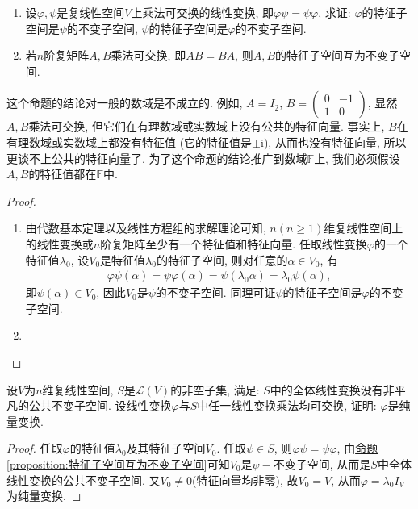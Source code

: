 \documentclass[../../main.tex]{subfiles}%
\begin{document}
\begin{proposition}[特征子空间互为不变子空间]\label{proposition:特征子空间互为不变子空间}
\begin{enumerate}
\item 设\(\varphi,\psi\)是复线性空间\(V\)上乘法可交换的线性变换, 即\(\varphi\psi = \psi\varphi\), 求证: \(\varphi\)的特征子空间是\(\psi\)的不变子空间, \(\psi\)的特征子空间是\(\varphi\)的不变子空间.

\item 若\(n\)阶复矩阵\(A,B\)乘法可交换, 即\(AB = BA\), 则\(A,B\)的特征子空间互为不变子空间.
\end{enumerate}
\end{proposition}
\begin{remark}
这个命题的结论对一般的数域是不成立的. 例如, \(A = I_{2}\), \(B=\begin{pmatrix}
0& -1\\
1& 0
\end{pmatrix}\), 显然\(A,B\)乘法可交换, 但它们在有理数域或实数域上没有公共的特征向量. 事实上, \(B\)在有理数域或实数域上都没有特征值 (它的特征值是\(\pm\mathrm{i}\)), 从而也没有特征向量, 所以更谈不上公共的特征向量了. 为了这个命题的结论推广到数域\(\mathbb{F}\)上, 我们必须假设\(A,B\)的特征值都在\(\mathbb{F}\)中.
\end{remark}
\begin{proof}
\begin{enumerate}
\item 由代数基本定理以及线性方程组的求解理论可知, \(n(n \geqslant  1)\)维复线性空间上的线性变换或\(n\)阶复矩阵至少有一个特征值和特征向量. 任取线性变换\(\varphi\)的一个特征值\(\lambda_{0}\), 设\(V_{0}\)是特征值\(\lambda_{0}\)的特征子空间, 则对任意的\(\alpha \in V_{0}\), 有
\begin{align*}
\varphi\psi(\alpha)=\psi\varphi(\alpha)=\psi(\lambda_{0}\alpha)=\lambda_{0}\psi(\alpha),
\end{align*}
即\(\psi(\alpha) \in V_{0}\), 因此\(V_{0}\)是\(\psi\)的不变子空间. 同理可证\(\psi\)的特征子空间是\(\varphi\)的不变子空间.

\item 
\end{enumerate}

\end{proof}

\begin{proposition}\label{proposition:线性变换与任意线性变换乘法可交换必是纯量变换}
设\(V\)为\(n\)维复线性空间, \(S\)是\(\mathcal{L}(V)\)的非空子集, 满足: \(S\)中的全体线性变换没有非平凡的公共不变子空间. 设线性变换\(\varphi\)与\(S\)中任一线性变换乘法均可交换, 证明: \(\varphi\)是纯量变换.
\end{proposition}
\begin{proof}

任取\(\varphi\)的特征值\(\lambda_{0}\)及其特征子空间\(V_{0}\). 任取\(\psi \in S\), 则\(\varphi\psi = \psi\varphi\), 由\hyperref[proposition:特征子空间互为不变子空间]{命题\ref{proposition:特征子空间互为不变子空间}}可知\(V_{0}\)是\(\psi -\)不变子空间, 从而是\(S\)中全体线性变换的公共不变子空间. 又\(V_{0} \neq 0\)(特征向量均非零), 故\(V_{0}=V\), 从而\(\varphi=\lambda_{0}I_{V}\)为纯量变换. 

\end{proof}
\end{document}
